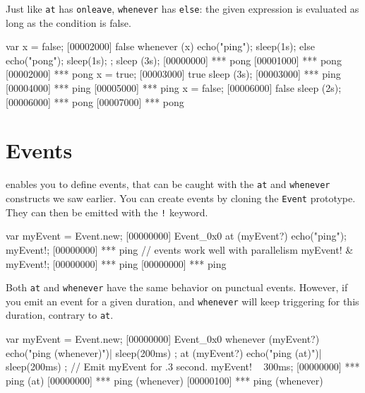 Just like \lstinline|at| has \lstinline|onleave|, \lstinline|whenever|
has \lstinline|else|: the given expression is evaluated as long as the
condition is false.

\begin{urbiscript}
var x = false;
[00002000] false
whenever (x)
{
  echo("ping");
  sleep(1s);
}
else
{
  echo("pong");
  sleep(1s);
};
sleep (3s);
[00000000] *** pong
[00001000] *** pong
[00002000] *** pong
x = true;
[00003000] true
sleep (3s);
[00003000] *** ping
[00004000] *** ping
[00005000] *** ping
x = false;
[00006000] false
sleep (2s);
[00006000] *** pong
[00007000] *** pong
\end{urbiscript}

\section{Events}
\label{sec:tut:events}
\us enables you to define events, that can be caught with the
\lstinline|at| and \lstinline|whenever| constructs we saw earlier. You
can create events by cloning the \lstinline|Event| prototype. They can
then be emitted with the \lstinline|!| keyword.

\begin{urbiscript}
var myEvent = Event.new;
[00000000] Event_0x0
at (myEvent?)
  echo("ping");
myEvent!;
[00000000] *** ping
// events work well with parallelism
myEvent! & myEvent!;
[00000000] *** ping
[00000000] *** ping
\end{urbiscript}

Both \lstinline|at| and \lstinline|whenever| have the same behavior on
punctual events. However, if you emit an event for a given duration,
and \lstinline|whenever| will keep triggering for this duration,
contrary to \lstinline|at|.

\begin{urbiscript}
var myEvent = Event.new;
[00000000] Event_0x0
whenever (myEvent?)
{
  echo("ping (whenever)")|
  sleep(200ms)
};
at (myEvent?)
{
  echo("ping (at)")|
  sleep(200ms)
};
// Emit myEvent for .3 second.
myEvent! ~ 300ms;
[00000000] *** ping (at)
[00000000] *** ping (whenever)
[00000100] *** ping (whenever)
\end{urbiscript}



